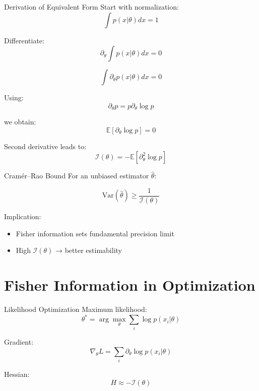 \documentclass{beamer}
\begin{document}
\begin{frame}{Derivation of Equivalent Form}
Start with normalization:
\[
\int p(x|\theta) dx = 1
\]

Differentiate:
\[
\partial_\theta \int p(x|\theta) dx = 0
\]

\[
\int \partial_\theta p(x|\theta) dx = 0
\]

\pause

Using:
\[
\partial_\theta p = p \partial_\theta \log p
\]

we obtain:
\[
\mathbb{E}[\partial_\theta \log p] = 0
\]

\pause

Second derivative leads to:
\[
\mathcal{I}(\theta)
= -\mathbb{E}[\partial_\theta^2 \log p]
\]

\end{frame}

\begin{frame}{Cramér–Rao Bound}
For an unbiased estimator $\hat{\theta}$:

\[
\mathrm{Var}(\hat{\theta}) \geq \frac{1}{\mathcal{I}(\theta)}
\]

\pause

Implication:
\begin{itemize}
\item Fisher information sets fundamental precision limit
\item High $\mathcal{I}(\theta)$ → better estimability
\end{itemize}

\end{frame}

\section{Fisher Information in Optimization}

\begin{frame}{Likelihood Optimization}
Maximum likelihood:
\[
\theta^* = \arg\max_\theta \sum_i \log p(x_i|\theta)
\]

\pause

Gradient:
\[
\nabla_\theta L = \sum_i \partial_\theta \log p(x_i|\theta)
\]

\pause

Hessian:
\[
H \approx - \mathcal{I}(\theta)
\]

\end{frame}
\end{document}
